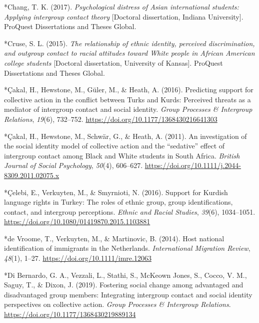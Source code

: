 \documentclass[12pt, letterpaper]{article}
\begin{document}
\leavevmode\hypertarget{ref-91}{}%
*Chang, T. K. (2017). \emph{Psychological distress of Asian
international students: Applying intergroup contact theory} {[}Doctoral
dissertation, Indiana University{]}. ProQuest Dissertations and Theses
Global.

\leavevmode\hypertarget{ref-1163}{}%
*Cruse, S. L. (2015). \emph{The relationship of ethnic identity,
perceived discrimination, and outgroup contact to racial attitudes
toward White people in African American college students} {[}Doctoral
dissertation, University of Kansas{]}. ProQuest Dissertations and Theses
Global.

\leavevmode\hypertarget{ref-1248}{}%
*Çakal, H., Hewstone, M., Güler, M., \& Heath, A. (2016). Predicting
support for collective action in the conflict between Turks and Kurds:
Perceived threats as a mediator of intergroup contact and social
identity. \emph{Group Processes \& Intergroup Relations}, \emph{19}(6),
732--752. \url{https://doi.org/10.1177/1368430216641303}

\leavevmode\hypertarget{ref-284}{}%
*Çakal, H., Hewstone, M., Schwär, G., \& Heath, A. (2011). An
investigation of the social identity model of collective action and the
``sedative'' effect of intergroup contact among Black and White students
in South Africa. \emph{British Journal of Social Psychology},
\emph{50}(4), 606--627.
\url{https://doi.org/10.1111/j.2044-8309.2011.02075.x}

\leavevmode\hypertarget{ref-1614}{}%
*Çelebi, E., Verkuyten, M., \& Smyrnioti, N. (2016). Support for Kurdish
language rights in Turkey: The roles of ethnic group, group
identifications, contact, and intergroup perceptions. \emph{Ethnic and
Racial Studies}, \emph{39}(6), 1034--1051.
\url{https://doi.org/10.1080/01419870.2015.1103881}

\leavevmode\hypertarget{ref-783}{}%
*de Vroome, T., Verkuyten, M., \& Martinovic, B. (2014). Host national
identification of immigrants in the Netherlands. \emph{International
Migration Review}, \emph{48}(1), 1--27.
\url{https://doi.org/10.1111/imre.12063}

\leavevmode\hypertarget{ref-3196}{}%
*Di Bernardo, G. A., Vezzali, L., Stathi, S., McKeown Jones, S., Cocco,
V. M., Saguy, T., \& Dixon, J. (2019). Fostering social change among
advantaged and disadvantaged group members: Integrating intergroup
contact and social identity perspectives on collective action.
\emph{Group Processes \& Intergroup Relations}.
\url{https://doi.org/10.1177/1368430219889134}
\end{document}
